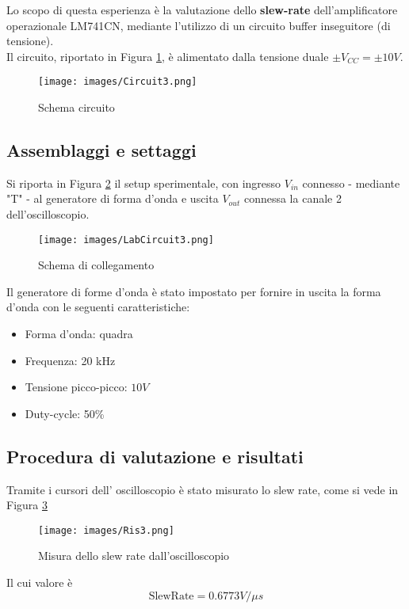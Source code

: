 Lo scopo di questa esperienza è la valutazione dello \textbf{slew-rate} dell’amplificatore operazionale LM741CN, mediante l’utilizzo di un circuito buffer inseguitore (di tensione).\\ Il circuito, riportato in Figura \ref{fig:Circuito3}, è alimentato dalla tensione duale $\pm V_{CC}=\pm 10V$.
\begin{figure}[h]
    \centering
    \texttt{[image: images/Circuit3.png]}
    \caption{Schema circuito}
    \label{fig:Circuito3}
\end{figure}
\subsection{Assemblaggi e settaggi}
Si riporta in Figura \ref{fig:LabCircuit3} il setup sperimentale, con ingresso $V_{in}$ connesso - mediante "T" - al generatore di forma d'onda e uscita $V_{out}$ connessa la canale 2 dell'oscilloscopio.
\begin{figure}[H]
    \centering
    \texttt{[image: images/LabCircuit3.png]}
    \caption{Schema di collegamento}
    \label{fig:LabCircuit3}
\end{figure}
Il generatore di forme d'onda è stato impostato per fornire in uscita la forma d'onda con le seguenti caratteristiche:
\begin{itemize}
    \item Forma d'onda: quadra
    \item Frequenza: 20 kHz
    \item Tensione picco-picco: $10V$
    \item Duty-cycle: 50\%
\end{itemize}
\subsection{Procedura di valutazione e risultati}
Tramite i cursori dell' oscilloscopio è stato misurato lo slew rate, come si vede in Figura \ref{fig:Ris3}
\begin{figure}[H]
    \centering
    \texttt{[image: images/Ris3.png]}
    \caption{Misura dello slew rate dall'oscilloscopio}
    \label{fig:Ris3}
\end{figure}
Il cui valore è
\begin{equation}
    \text{SlewRate} = 0.6773V/\mu s
\end{equation}